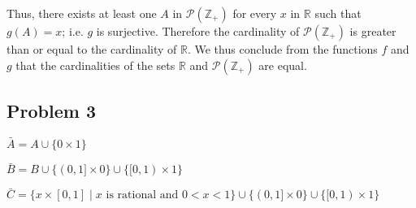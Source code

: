 \documentclass[12 pt]{article}
\begin{document}
Thus, there exists at least one $A$ in $\mathcal{P}(\mathbb{Z_+})$ for every $x$ in $\mathbb{R}$ such that $g(A)=x$; i.e. $g$ is surjective.  Therefore the cardinality of $\mathcal{P}(\mathbb{Z_+})$ is greater than or equal to the cardinality of $\mathbb{R}$.  We thus conclude from the functions $f$ and $g$ that the cardinalities of the sets $\mathbb{R}$ and $\mathcal{P}(\mathbb{Z_+})$ are equal.

\subsection*{Problem 3}
$\bar{A}=A\cup\{0\times1\}$
\bigskip

\noindent$\bar{B}=B\cup\{(0,1]\times0\}\cup\{[0,1)\times1\}$
\bigskip

\noindent$\bar{C}=\{x\times[0,1]\;|\;x\textrm{ is rational and }0<x<1\}\cup\{(0,1]\times0\}\cup\{[0,1)\times1\}$
\end{document}
